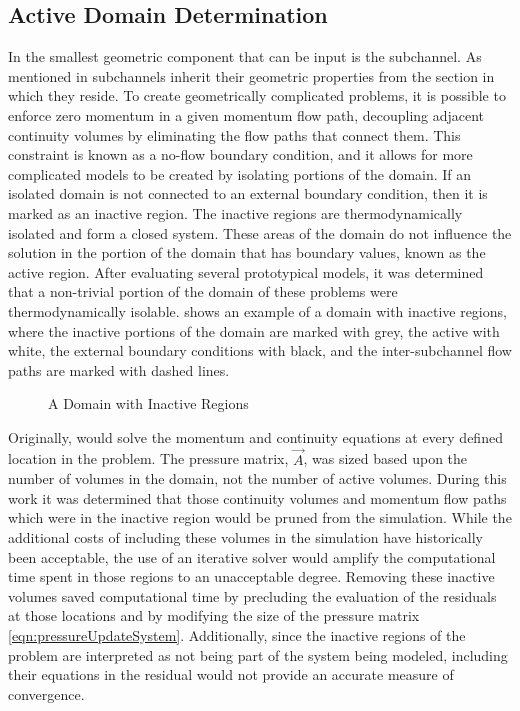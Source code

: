 \subsection{Active Domain Determination}
\label{subsect:activeDomainDetermination}
In \cobra{} the smallest geometric component that can be input is the subchannel.
As mentioned in  subchannels inherit their geometric properties from the section in which they reside.
To create geometrically complicated problems, it is possible to enforce zero momentum in a given momentum flow path, decoupling adjacent continuity volumes by eliminating the flow paths that connect them.
This constraint is known as a no-flow boundary condition, and it allows for more complicated models to be created by isolating portions of the domain.
If an isolated domain is not connected to an external boundary condition, then it is marked as an inactive region.
The inactive regions are thermodynamically isolated and form a closed system.
These areas of the domain do not influence the solution in the portion of the domain that has boundary values, known as the active region.
After evaluating several prototypical models, it was determined that a non-trivial portion of the domain of these problems were thermodynamically isolable.
 shows an example of a domain with inactive regions, where the inactive portions of the domain are marked with grey, the active with white, the external boundary conditions with black, and the inter-subchannel flow paths are marked with dashed lines.

\begin{figure}[ht!]
\centering

\caption{A Domain with Inactive Regions}
\label{fig:activeDomain}
\end{figure}

Originally, \cobra{} would solve the momentum and continuity equations at every defined location in the problem.
The pressure matrix, $\vec{A}$, was sized based upon the number of volumes in the domain, not the number of active volumes.
During this work it was determined that those continuity volumes and momentum flow paths which were in the inactive region would be pruned from the simulation.
While the additional costs of including these volumes in the simulation have historically been acceptable, the use of an iterative solver would amplify the computational time spent in those regions to an unacceptable degree.
Removing these inactive volumes saved computational time by precluding the evaluation of the residuals at those locations and by modifying the size of the pressure matrix \eqref{eqn:pressureUpdateSystem}.
Additionally, since the inactive regions of the problem are interpreted as not being part of the system being modeled, including their equations in the residual would not provide an accurate measure of convergence.

